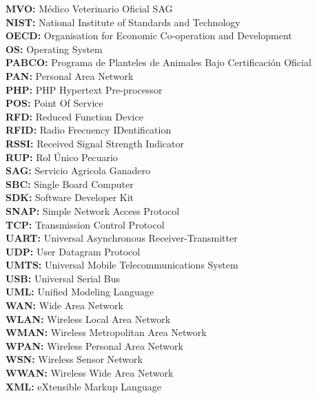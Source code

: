 \begin{spacing}{1.2}
\textbf{MVO:} Médico Veterinario Oficial SAG\\ 
\textbf{NIST:} National Institute of Standards and Technology\\
\textbf{OECD:} Organisation for Economic Co-operation and Development\\
\textbf{OS:} Operating System\\
\textbf{PABCO:} Programa de Planteles de Animales Bajo Certificación Oficial\\
\textbf{PAN:} Personal Area Network\\
\textbf{PHP:} PHP Hypertext Pre-processor\\
\textbf{POS:} Point Of Service\\
\textbf{RFD:} Reduced Function Device\\
\textbf{RFID:} Radio Frecuency IDentification\\
\textbf{RSSI:} Received Signal Strength Indicator\\
\textbf{RUP:} Rol Único Pecuario\\
\textbf{SAG:} Servicio Agricola Ganadero\\
\textbf{SBC:} Single Board Computer\\
\textbf{SDK:} Software Developer Kit\\
\textbf{SNAP:} Simple Network Access Protocol\\
\textbf{TCP:} Transmission Control Protocol\\
\textbf{UART:} Universal Asynchronous Receiver-Transmitter\\
\textbf{UDP:} User Datagram Protocol\\
\textbf{UMTS:} Universal Mobile Telecommunications System\\
\textbf{USB:} Universal Serial Bus\\
\textbf{UML:} Unified Modeling Language\\
\textbf{WAN:} Wide Area Network\\
\textbf{WLAN:} Wireless Local Area Network\\
\textbf{WMAN:} Wireless Metropolitan Area Network\\
\textbf{WPAN:} Wireless Personal Area Network\\
\textbf{WSN:} Wireless Sensor Network\\
\textbf{WWAN:} Wireless Wide Area Network\\
\textbf{XML:} eXtensible Markup Language\\
\end{spacing}


